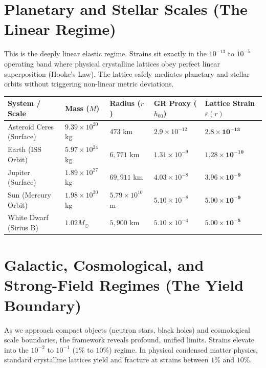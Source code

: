 \documentclass[11pt, letterpaper, openany]{book}
\begin{document}
\section{Planetary and Stellar Scales (The Linear Regime)}

This is the deeply linear elastic regime. Strains sit exactly in the $10^{-13}$ to $10^{-5}$ operating band where physical crystalline lattices obey perfect linear superposition (Hooke's Law). The lattice safely mediates planetary and stellar orbits without triggering non-linear metric deviations.

\begin{center}
\renewcommand{\arraystretch}{1.2}
\small
\begin{tabular}{|p{3.5cm}|p{2cm}|p{2.5cm}|p{2.2cm}|p{2.5cm}|}
\hline
\rowcolor{kishblue!12}
\textbf{System / Scale} & \textbf{Mass ($M$)} & \textbf{Radius ($r$)} & \textbf{GR Proxy ($h_{00}$)} & \textbf{Lattice Strain $\varepsilon(r)$} \\
\hline
Asteroid Ceres (Surface) & $9.39 \times 10^{20}$ kg & $473$ km & $2.9 \times 10^{-12}$ & $\mathbf{2.8 \times 10^{-13}}$ \\
\hline
Earth (ISS Orbit) & $5.97 \times 10^{24}$ kg & $6,771$ km & $1.31 \times 10^{-9}$ & $\mathbf{1.28 \times 10^{-10}}$ \\
\hline
Jupiter (Surface) & $1.89 \times 10^{27}$ kg & $69,911$ km & $4.03 \times 10^{-8}$ & $\mathbf{3.96 \times 10^{-9}}$ \\
\hline
Sun (Mercury Orbit) & $1.98 \times 10^{30}$ kg & $5.79 \times 10^{10}$ m & $5.10 \times 10^{-8}$ & $\mathbf{5.00 \times 10^{-9}}$ \\
\hline
White Dwarf (Sirius B) & $1.02 M_\odot$ & $5,900$ km & $5.10 \times 10^{-4}$ & $\mathbf{5.00 \times 10^{-5}}$ \\
\hline
\end{tabular}
\end{center}

\section{Galactic, Cosmological, and Strong-Field Regimes (The Yield Boundary)}

As we approach compact objects (neutron stars, black holes) and cosmological scale boundaries, the framework reveals profound, unified limits. Strains elevate into the $10^{-2}$ to $10^{-1}$ ($1\%$ to $10\%$) regime. In physical condensed matter physics, standard crystalline lattices yield and fracture at strains between $1\%$ and $10\%$.
\end{document}
